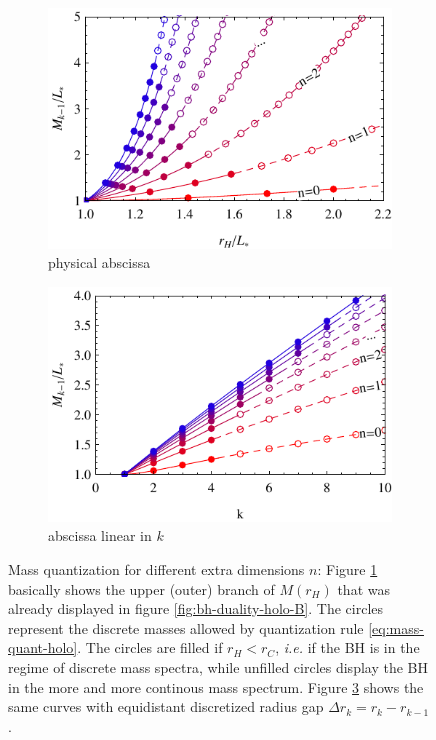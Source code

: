 \documentclass[12pt,a4paper]{report}
\numberwithin{equation}{chapter}
\begin{document}
\begin{figure}[b!]
\centering
\begin{subfigure}{0.45\textwidth}
\caption{physical abscissa}\label{fig:mass-quantization-a}
\includegraphics[scale=1]{figures/mass-quantization.pdf}
\end{subfigure}%
\hspace{0.05\textwidth}
\begin{subfigure}{0.45\textwidth}
\caption{abscissa linear in $k$}\label{fig:mass-quantization-b}
\includegraphics[scale=1]{figures/mass-quantization-linear.pdf}
\end{subfigure}%
\caption[Mass quantization plot for the holographic metric]{Mass quantization for different extra dimensions $n$: Figure \ref{fig:mass-quantization-a} basically shows the upper (outer) branch of $M(r_H)$ that was already displayed in figure \ref{fig:bh-duality-holo-B}. The circles represent the discrete masses allowed by quantization rule \eqref{eq:mass-quant-holo}. The circles are filled if $r_H < r_C$, \emph{i.e.} if the BH is in the regime of discrete mass spectra, while unfilled circles display the BH in the more and more continous mass spectrum. Figure \ref{fig:mass-quantization-b} shows the same curves with equidistant discretized radius gap $\Delta r_k = r_k - r_{k-1}$.}
\end{figure}
\end{document}
